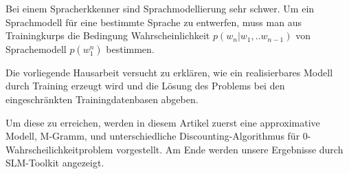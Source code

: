Bei einem Spracherkkenner sind Sprachmodellierung sehr schwer. Um ein Sprachmodell f\"ur eine bestimmte Sprache zu entwerfen, muss man aus Trainingkurps die Bedingung Wahrscheinlichkeit $p(w_{n}|w_{1},..w_{n-1})$   von Sprachemodell $p(w_{1}^n)$   bestimmen.

Die vorliegende Hausarbeit versucht zu erkl\"aren, wie ein realisierbares Modell durch Training erzeugt wird und die L\"osung des Problems bei den eingeschr\"ankten Trainingdatenbasen abgeben. 

Um diese zu erreichen, werden in diesem Artikel zuerst eine approximative Modell, M-Gramm, und unterschiedliche Discounting-Algorithmus f\"ur 0-Wahrscheilichkeitproblem vorgestellt. Am Ende werden unsere Ergebnisse durch SLM-Toolkit angezeigt.
